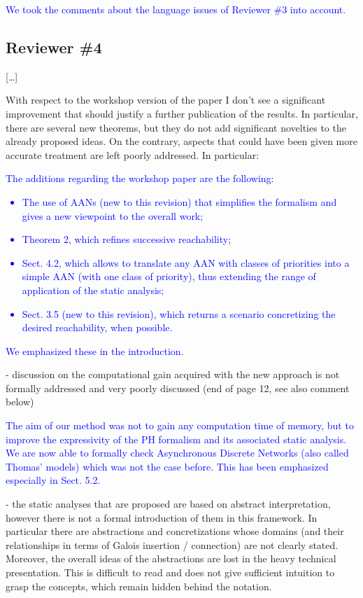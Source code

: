 \documentclass[11pt]{article}
\newcommand{\answer}[1]{\textcolor{blue}{#1}\vspace*{1em}}
\begin{document}
\answer{
We took the comments about the language issues of Reviewer \#3 into account.
}



\subsection*{Reviewer \#4}

[…]

With respect to the workshop version of the paper I don't see a significant improvement that should justify a further publication of the results. In particular, there are several new theorems, but they do not add significant novelties to the already proposed ideas. On the contrary, aspects that could have been given more accurate treatment are left poorly addressed. In particular:

\answer{
The additions regarding the workshop paper are the following:
\begin{itemize}
  \item The use of AANs (new to this revision) that simplifies the formalism
    and gives a new viewpoint to the overall work;
  \item Theorem 2, which refines successive reachability;
  \item Sect. 4.2, which allows to translate any AAN with classes of priorities
    into a simple AAN (with one class of priority),
    thus extending the range of application of the static analysis;
  \item Sect. 3.5 (new to this revision),
    which returns a scenario concretizing the desired reachability, when possible.
\end{itemize}
We emphasized these in the introduction.
}

- discussion on the computational gain acquired with the new approach is not formally addressed and very poorly discussed (end of page 12, see also comment below)

\answer{
The aim of our method was not to gain any computation time of memory,
but to improve the expressivity of the PH formalism and its associated static analysis.
We are now able to formally check Asynchronous Discrete Networks
(also called Thomas' models)
which was not the case before.
This has been emphasized especially in Sect. 5.2.
}

- the static analyses that are proposed are based on abstract interpretation, however there is not a formal introduction of them in this framework. In particular there are abstractions and concretizations whose domains (and their relationships in terms of Galois insertion / connection) are not clearly stated. Moreover, the overall ideas of the abstractions are lost in the heavy technical presentation. This is difficult to read and does not give sufficient intuition to grasp the concepts, which remain hidden behind the notation. 
\end{document}
